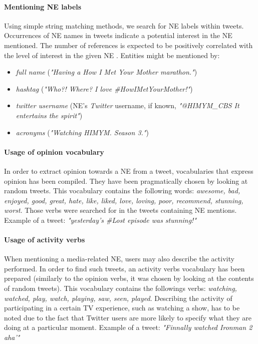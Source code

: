 \paragraph{Mentioning NE labels}
Using simple string matching methods, we search for NE labels within tweets.
Occurrences of NE names in tweets indicate a potential interest in the NE mentioned. The
number of references is expected to be positively correlated with the level of interest in the given NE \cite{twitter-content-is-it}.
Entities might be mentioned by:
\begin{itemize}
  \item \textit{full name} (\eg \textit{"Having a How I Met Your Mother marathon."})
  \item \textit{hashtag} (\eg \textit{"Who?! Where? I love \#HowIMetYourMother!"})
  \item \textit{twitter username} (NE's \textit{Twitter} username, if known, \eg \textit{"@HIMYM\_CBS It entertains the spirit"})
  \item \textit{acronyms} (\eg \textit{"Watching HIMYM. Season 3."})
\end{itemize}
\paragraph{Usage of opinion vocabulary}
In order to extract opinion towards a NE from a tweet, vocabularies that express
opinion has been compiled. They have been pragmatically chosen by looking at random tweets.
This vocabulary contains the following words: \textit{awesome, bad, enjoyed, good, great, hate,
like, liked, love, loving, poor, recommend, stunning, worst}.
Those verbs were searched for in the tweets containing NE mentions.
Example of a tweet: \textit{"yesterday's \#Lost episode was stunning!"}
\paragraph{Usage of activity verbs}
When mentioning a media-related NE, users may also describe the activity performed.
In order to find such tweets, an activity verbs vocabulary has been prepared (similarly to
the opinion verbs, it was chosen by looking at the contents of random tweets).
This vocabulary contains the followings verbs: \textit{watching, watched, play,
watch, playing, saw, seen, played}.
Describing the activity of participating in a certain TV experience, such
as watching a show, has to be noted due to the fact that Twitter users are more
likely to specify what they are doing at a particular moment.
Example of a tweet: \textit{"Finnally watched Ironman 2 aha'"}

